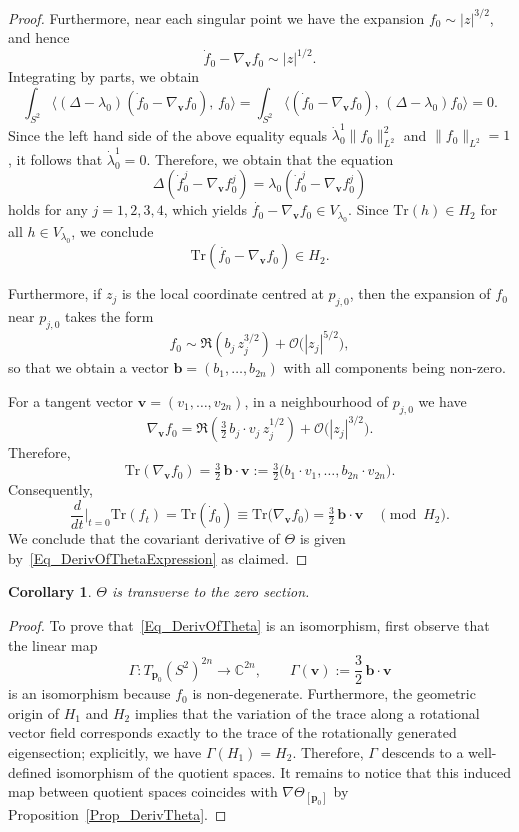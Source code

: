 \documentclass[11pt]{amsart}
\newtheorem{corollary}[theorem]{Corollary}
\newcommand{\MO}{\mathcal{O}}
\newcommand{\Tr}{\mathrm{Tr}}
\newcommand{\mbp}{\mathbf{p}}
\newcommand{\mbv}{\mathbf{v}}
\begin{document}
\begin{proof}
Furthermore, near each singular point we have the expansion $f_0\sim |z|^{3/2}$, and hence
\[
\dot{f}_0-\nabla_{\mbv} f_0 \sim |z|^{1/2}.
\]
Integrating by parts, we obtain
\[
\int_{S^2} \langle (\Delta-\lambda_0)(\dot{f}_0-\nabla_{\mbv} f_0),\, f_0\rangle = \int_{S^2} \langle (\dot{f}_0-\nabla_{\mbv} f_0),\, (\Delta-\lambda_0) f_0\rangle =0.
\]
Since the left hand side of the above equality equals $\dot{\lambda}_0^1\| f_0\|^2_{L^2}$ and $\|f_0\|_{L^2}=1$, it follows that $\dot{\lambda}_0^1=0$. Therefore, we obtain that the equation
\[
\Delta(\dot{f}_0^j-\nabla_{\mbv} f_0^j)=\lambda_0(\dot{f}_0^j-\nabla_{\mbv} f_0^j)
\]
holds for any $j=1,2,3,4$, which yields $\dot{f_0}-\nabla_{\mbv} f_0\in V_{\lambda_0}$.  
Since $\Tr(h)\in H_2$ for all $h\in V_{\lambda_0}$, we conclude
\[
\Tr(\dot{f_0}-\nabla_{\mbv} f_0)\in H_2.
\]

Furthermore, if $z_j$ is the local coordinate centred at $p_{j,0}$, then the expansion of $f_0$ near $p_{j,0}$ takes the form
\[
f_0 \sim \Re\!\left(b_j\, z_j^{3/2}\right)+\MO\big (|z_j|^{5/2}\big ),
\]
so that we obtain a vector $\mathbf{b}=(b_1,\ldots,b_{2n})$ with all components being non-zero. 

For a tangent vector $\mathbf{v}=(v_1,\ldots,v_{2n})$, in a neighbourhood of $p_{j,0}$ we have
\[
\nabla_{\mathbf{v}} f_0
= \Re\!\left(\tfrac{3}{2}\, b_j\cdot v_j\, z_j^{1/2}\right)
+ \MO\big (|z_j|^{3/2}\big ).
\]
Therefore,
\[
\Tr(\nabla_{\mathbf{v}} f_0)=\tfrac{3}{2}\,\mathbf{b}\cdot\mathbf{v} := \tfrac 32 \big ( b_1\cdot v_1,\ldots, b_{2n}\cdot v_{2n} \big). 
\]
Consequently,
\[
\frac{d}{dt}\Big|_{t=0}\Tr(f_t)
= \Tr (\dot f_0)\equiv \Tr\big (  \nabla_\mbv f_0 \big )
=\tfrac{3}{2}\,\mathbf{b}\cdot \mbv
\quad\pmod{H_2}.
\]
We conclude that the covariant derivative of $\Theta$ is given by~\eqref{Eq_DerivOfThetaExpression} as claimed.
\end{proof}

\begin{corollary}\label{prop_isomorphism}
	$\Theta$ is transverse to the zero section.
\end{corollary}
\begin{proof}
  To prove that~\eqref{Eq_DerivOfTheta}  is an isomorphism, first observe that the linear map
  \[
  \Gamma: T_{\mbp_0}(S^2)^{2n} \longrightarrow \mathbb{C}^{2n},
  \qquad \Gamma(\mbv) := \frac{3}{2}\, \mathbf{b}\cdot \mbv
  \]
  is an isomorphism because $f_0$ is non-degenerate. Furthermore, the geometric origin
  of $H_1$ and $H_2$ implies that the variation of the trace along a
  rotational vector field corresponds exactly to the trace of the
  rotationally generated eigensection; explicitly, we have
  $\Gamma(H_1) = H_2$. 
  Therefore, $\Gamma$ descends to a well-defined isomorphism of the quotient
  spaces. 
  It remains to notice that this induced map between quotient spaces coincides with $\nabla\Theta_{[\mbp_0]}$ by Proposition~\ref{Prop_DerivTheta}.
\end{proof}
\end{document}
